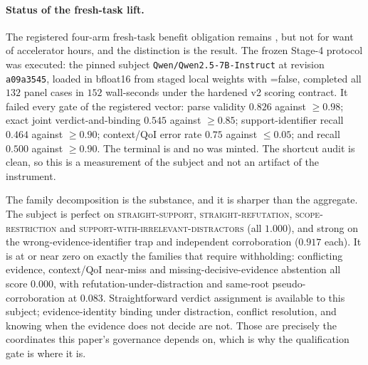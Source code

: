 \paragraph{Status of the fresh-task lift.}
The registered four-arm fresh-task benefit obligation remains , but not for want of accelerator hours, and the distinction is the result. The frozen Stage-4 protocol was executed: the pinned subject \texttt{Qwen/Qwen2.5-7B-Instruct} at revision \texttt{a09a3545}, loaded in bfloat16 from staged local weights with =false, completed all $132$ panel cases in $152$ wall-seconds under the hardened v2 scoring contract. It failed every gate of the registered vector: parse validity $0.826$ against $\ge0.98$; exact joint verdict-and-binding $0.545$ against $\ge0.85$; support-identifier recall $0.464$ against $\ge0.90$; context/QoI error rate $0.75$ against $\le0.05$; and \CANNOTCHECK{} recall $0.500$ against $\ge0.90$. The terminal is  and no  was minted. The shortcut audit is clean, so this is a measurement of the subject and not an artifact of the instrument.

The family decomposition is the substance, and it is sharper than the aggregate. The subject is perfect on \textsc{straight-support}, \textsc{straight-refutation}, \textsc{scope-restriction} and \textsc{support-with-irrelevant-distractors} (all $1.000$), and strong on the wrong-evidence-identifier trap and independent corroboration ($0.917$ each). It is at or near zero on exactly the families that require withholding: conflicting evidence, context/QoI near-miss and missing-decisive-evidence abstention all score $0.000$, with refutation-under-distraction and same-root pseudo-corroboration at $0.083$. Straightforward verdict assignment is available to this subject; evidence-identity binding under distraction, conflict resolution, and knowing when the evidence does not decide are not. Those are precisely the coordinates this paper's governance depends on, which is why the qualification gate is where it is.

